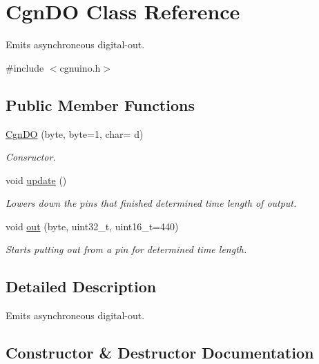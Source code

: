 \hypertarget{classCgnDO}{}\section{Cgn\+DO Class Reference}
\label{classCgnDO}


Emits asynchroneous digital-\/out.  




{\ttfamily \#include $<$cgnuino.\+h$>$}

\subsection*{Public Member Functions}
\begin{DoxyCompactItemize}
\item 
\hyperlink{classCgnDO_ae76f2ab7e8cf24a92a668daf1de50b77}{Cgn\+DO} (byte, byte=1, char= \textquotesingle{}d\textquotesingle{})
\begin{DoxyCompactList}\small\item\em Consructor. \end{DoxyCompactList}\item 
void \hyperlink{classCgnDO_a82059b0f49870691dbd708d546f495c6}{update} ()
\begin{DoxyCompactList}\small\item\em Lowers down the pins that finished determined time length of output. \end{DoxyCompactList}\item 
void \hyperlink{classCgnDO_ad7dfec2bd60bb05c6a5075428ebe434f}{out} (byte, uint32\+\_\+t, uint16\+\_\+t=440)
\begin{DoxyCompactList}\small\item\em Starts putting out from a pin for determined time length. \end{DoxyCompactList}\end{DoxyCompactItemize}


\subsection{Detailed Description}
Emits asynchroneous digital-\/out. 

\subsection{Constructor \& Destructor Documentation}
